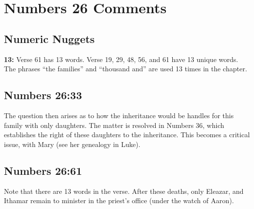 \section{Numbers 26 Comments}

\subsection{Numeric Nuggets}
\textbf{13: } Verse 61 has 13 words. Verse 19, 29, 48, 56, and 61 have 13 unique words. The phrases  ``the families'' and ``thousand and'' are used 13 times in the chapter.

\subsection{Numbers 26:33}
The question then arises as to how the inheritance would be handles for this family with only daughters. The matter is resolved in Numbers 36, which establishes the right of these daughters to the inheritance. This becomes a critical issue, with Mary (see her genealogy in Luke). 

\subsection{Numbers 26:61}
Note that there are 13 words in the verse. After these deaths, only Eleazar, and Ithamar remain to minister in the priest's office (under the watch of Aaron).
